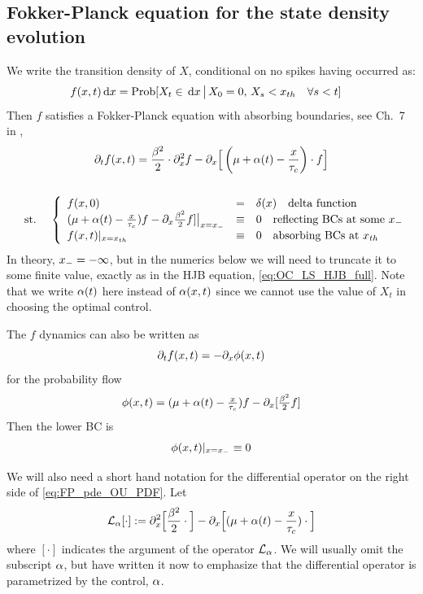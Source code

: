 \documentclass{article}
\begin{document}
\subsection{Fokker-Planck equation for the state density evolution}
We write the transition density of $X$, conditional on no
spikes having occurred as:
\begin{align*}
f(x,t) \, \mathrm{d} x &= \operatorname{Prob}[X_t\in \, \mathrm{d} x \,\big|\, X_0 = 0,\, X_{s} < { x_{th} } \quad
\forall s < t]
\end{align*}
Then $f$ satisfies a Fokker-Planck equation with absorbing boundaries,
see Ch.\ 7 in \cite{Jacobs},
\begin{equation}
\begin{gathered}
{\partial}_t f(x,t) =
				\frac{{\beta}^2 }{2}\cdot {\partial}^2_x f -
				{\partial}_x \Big[ \left( {\mu } + {\alpha}(t)- \frac{x}{{ \tau_{c} }}\right)  \cdot f \Big]
\\
\\
\begin{array}{lll}
	&\textrm{st.\ }&
	\left\{ \begin{array}{lcl}
	 f(x,0) &=& \delta(x) \quad \textrm{delta function}
	\\
	({\mu } + {\alpha}(t)- \tfrac x {{ \tau_{c} }})f - {\partial}_x \tfrac {{\beta}^2}2 f] \big|_{x={ x_{-} }} &\equiv&
	0 \quad \textrm{reflecting BCs at some } { x_{-} }
	\\
	f(x,t) |_{x={ x_{th} }} &\equiv& 0 \quad \textrm{absorbing BCs at } { x_{th} }
\end{array} \right.
\end{array}
\label{eq:FP_pde_OU_PDF}
\end{gathered}
\end{equation}
In theory, ${ x_{-} } = -\infty$, but in the numerics below we will need to
truncate it to some finite value, exactly as in the HJB equation,
\cref{eq:OC_LS_HJB_full}.
Note that we write ${\alpha}(t)$ here instead of ${\alpha}(x,t)$ since we cannot use the
value of $X_t$ in choosing the optimal control. 

The $f$ dynamics can also be written as
$$
{\partial}_t f(x,t) = - {\partial}_x \phi(x,t)
$$
for the probability flow
$$
\phi(x,t) = ({\mu } + {\alpha}(t) - \tfrac x {{ \tau_{c} }})f - {\partial}_x [\tfrac {{\beta}^2}2 f]
$$
Then the lower BC is
$$
\phi(x,t) |_{x={ x_{-} }} \equiv 0
$$

We will also need a short hand notation for the differential operator on the
right side of \cref{eq:FP_pde_OU_PDF}. Let
$$ { \mathcal{L} }_{\alpha}[\cdot] := {\partial}^2_x \Big[\frac{{\beta}^2 }{2} \cdot\Big] -
 {\partial}_x \Big[ ({\mu } + {\alpha}(t)- \frac{x}{{ \tau_{c} }}) \cdot \Big] $$where
 $[\cdot]$ indicates the argument of the operator ${ \mathcal{L} }_{\alpha}$. We will usually
 omit the subscript ${\alpha}$, but have written it now to emphasize that the
 differential operator is parametrized by the control, ${\alpha}$.
\end{document}
